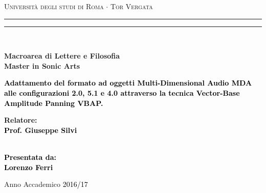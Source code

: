 \documentclass[12pt,a4paper]{report}
\begin{document}
\begin{titlepage}
\begin{center}
{\Large{\textsc{Università degli studi di Roma $\cdot$ Tor Vergata}}}
\rule[0.1cm]{15.8cm}{0.1mm}
\rule[0.5cm]{15.8cm}{0.6mm}
\\\vspace{3mm}

{\small{\bf Macroarea di Lettere e Filosofia \\ Master in Sonic Arts}}

\end{center}

\vspace{23mm}

\begin{center}
\begin{spacing}{1.7}
\textcolor{black}{
\linespread{5}
{\LARGE{\bf
Adattamento del formato ad oggetti Multi-Dimensional Audio MDA alle configurazioni 2.0, 5.1 e 4.0 attraverso la tecnica Vector-Base Amplitude Panning VBAP.
}}}

\end{spacing}
\end{center}

\vspace{50mm} \par \noindent

\begin{minipage}[t]{0.47\textwidth}

{\large{\bf Relatore: \vspace{2mm}\\\textcolor{black}{
Prof. Giuseppe Silvi}\\\\

}
}
\end{minipage}
%
\hfill
%
\begin{minipage}[t]{0.47\textwidth}\raggedleft \textcolor{black}{
{\large{\bf Presentata da:
\vspace{2mm}\\
Lorenzo Ferri}}}
\end{minipage}

\vspace{5mm}

\begin{center}

{\large{%

Anno Accademico \textcolor{black}{2016/17}}}
\end{center}

\newpage\null\thispagestyle{empty}

\end{titlepage}
\end{document}
